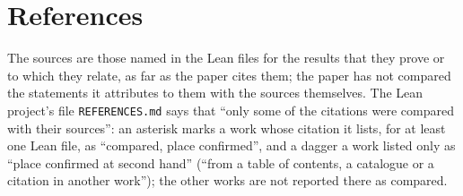 \section*{References}\label{sec:references}
The sources are those named in the Lean files for the results that they prove or to which they
relate, as far as the paper cites them; the paper has not compared the statements it attributes to
them with the sources themselves. The Lean project's file \texttt{REFERENCES.md} says that ``only
some of the citations were compared with their sources'': an asterisk marks a work whose citation
it lists, for at least one Lean file, as ``compared, place confirmed'', and a dagger a work listed
only as ``place confirmed at second hand'' (``from a table of contents, a catalogue or a citation
in another work''); the other works are not reported there as compared.
\begingroup\small
